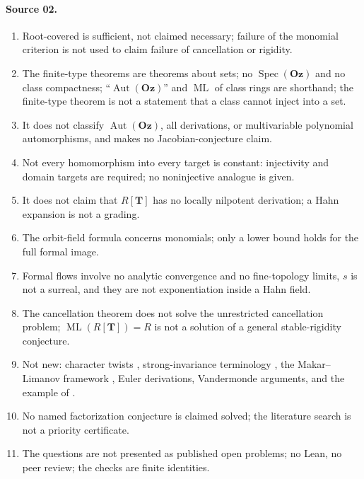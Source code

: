 \documentclass[11pt,oneside]{article}
\numberwithin{equation}{section}
\theoremstyle{definition}
\theoremstyle{remark}
\newcommand{\Oz}{\mathbf{Oz}}
\newcommand{\Aut}{\operatorname{Aut}}
\newcommand{\ML}{\operatorname{ML}}
\begin{document}
\paragraph{Source 02.}
\begin{enumerate}[itemsep=1pt]
\item Root-covered is sufficient, not claimed necessary; failure of the monomial criterion
is not used to claim failure of cancellation or rigidity.
\item The finite-type theorems are theorems about sets; no $\operatorname{Spec}(\Oz)$ and no
class compactness; ``$\Aut(\Oz)$'' and $\ML$ of class rings are shorthand; the finite-type
theorem is not a statement that a class cannot inject into a set.
\item It does not classify $\Aut(\Oz)$, all derivations, or multivariable polynomial
automorphisms, and makes no Jacobian-conjecture claim.
\item Not every homomorphism into every target is constant: injectivity and domain targets
are required; no noninjective analogue is given.
\item It does not claim that $R[\mathbf T]$ has no locally nilpotent derivation; a Hahn
expansion is not a grading.
\item The orbit-field formula concerns monomials; only a lower bound holds for the full
formal image.
\item Formal flows involve no analytic convergence and no fine-topology limits, $s$ is not a
surreal, and they are not exponentiation inside a Hahn field.
\item The cancellation theorem does not solve the unrestricted cancellation problem;
$\ML(R[\mathbf T])=R$ is not a solution of a general stable-rigidity conjecture.
\item Not new: character twists \cite{KKS}, strong-invariance terminology \cite{Hirano}, the
Makar--Limanov framework \cite{CD}, Euler derivations, Vandermonde arguments, and the
example of \cite{LM}.
\item No named factorization conjecture is claimed solved; the literature search is not a
priority certificate.
\item The questions are not presented as published open problems; no Lean, no peer review;
the checks are finite identities.
\end{enumerate}
\end{document}
